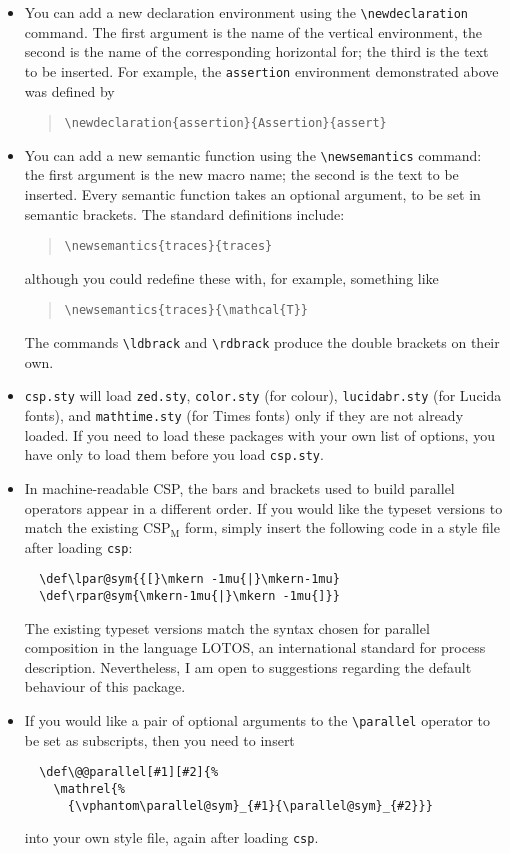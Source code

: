 \documentclass[fleqn,a4paper]{article}
\begin{document}
\begin{itemize}
\item You can add a new declaration environment using the
  \verb=\newdeclaration= command.  The first argument is the name of
  the vertical environment, the second is the name of the
  corresponding horizontal for; the third is the text to be inserted.
  For example, the \verb=assertion= environment demonstrated above was
  defined by
\begin{quote}
  \verb=\newdeclaration{assertion}{Assertion}{assert}=
\end{quote}

\item You can add a new semantic function using the
  \verb=\newsemantics= command: the first argument is the new macro
  name; the second is the text to be inserted.  Every semantic
  function takes an optional argument, to be set in semantic brackets.
  The standard definitions include:
\begin{quote}
  \verb=\newsemantics{traces}{traces}=
\end{quote}
although you could redefine these with, for example, something like
\begin{quote}
  \verb=\newsemantics{traces}{\mathcal{T}}=
\end{quote}
The commands \verb=\ldbrack= and \verb=\rdbrack= produce the double
brackets on their own.

\item \verb=csp.sty= will load \verb=zed.sty=, \verb=color.sty= (for
  colour), \verb=lucidabr.sty= (for Lucida fonts), and
  \verb=mathtime.sty= (for Times fonts) only if they are not already
  loaded.  If you need to load these packages with your own list of
  options, you have only to load them before you load \verb=csp.sty=.

  
\item In machine-readable CSP, the bars and brackets used to build
  parallel operators appear in a different order.  If you would like
  the typeset versions to match the existing $\mathrm{CSP_M}$ form,
  simply insert the following code in a style file after loading
  \verb=csp=:
\begin{verbatim}
  \def\lpar@sym{{[}\mkern -1mu{|}\mkern-1mu}
  \def\rpar@sym{\mkern-1mu{|}\mkern -1mu{]}}
\end{verbatim}
  The existing typeset versions match the syntax chosen for parallel
  composition in the language LOTOS, an international standard for
  process description.  Nevertheless, I am open to suggestions
  regarding the default behaviour of this package.
  
\item If you would like a pair of optional arguments to the
  \verb=\parallel= operator to be set as subscripts, then you need to
  insert
\begin{verbatim}
  \def\@@parallel[#1][#2]{%
    \mathrel{%
      {\vphantom\parallel@sym}_{#1}{\parallel@sym}_{#2}}}
\end{verbatim}
  into your own style file, again after loading \verb=csp=. 
  
\end{itemize}
\end{document}
